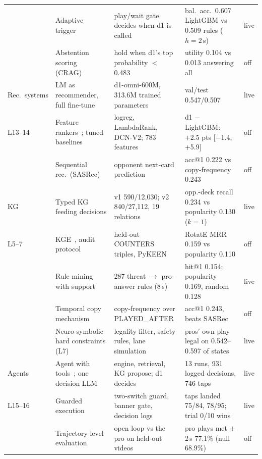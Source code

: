 \begin{table}[t]
\begin{tabular}{@{}L{1.8cm}L{4.55cm}L{4.55cm}L{5.0cm}l@{}}
 & Adaptive trigger~\cite{jiang2023flare,jeong2024adaptiverag} & play/wait gate decides when d1 is called & bal.\ acc.\ 0.607 LightGBM vs 0.509 rules ($h{=}2$\,s) & live\\
 & Abstention scoring (CRAG)~\cite{yang2024cragbench} & hold when d1's top probability $<$ 0.483 & utility 0.104 vs 0.013 answering all & off\\
Rec.\ systems
 & LM as recommender, full fine-tune~\cite{bao2023tallrec,geng2022p5} & d1-omni-600M, 313.6M trained parameters & val/test 0.547/0.507 & live\\
L13--14~\cite{lim2026l13,lim2026l14}
 & Feature rankers~\cite{wang2021dcnv2,burges2010lambdamart}; tuned baselines~\cite{rendle2020ncfvsmf} & logreg, LambdaRank, DCN-V2; 783 features & d1 $-$ LightGBM: +2.5 pts [$-$1.4, +5.9] & off\\
 & Sequential rec.\ (SASRec)~\cite{kang2018sasrec} & opponent next-card prediction & acc@1 0.222 vs copy-frequency 0.243 & off\\
KG
 & Typed KG feeding decisions & v1 590/12,030; v2 840/27,112, 19 relations & opp.-deck recall 0.234 vs popularity 0.130 ($k{=}1$) & live\\
L5--7~\cite{cap6938L05,cap6938L06C,cap6938L07}
 & KGE~\cite{bordes2013transe,yang2015distmult,trouillon2016complex,sun2019rotate}, audit protocol~\cite{ruffinelli2020olddog,sun2020reevaluation} & held-out COUNTERS triples, PyKEEN~\cite{ali2021pykeen} & RotatE MRR 0.159 vs popularity 0.110 & off\\
 & Rule mining with support~\cite{lajus2020amie3,liu2022tlogic} & 287 threat $\rightarrow$ pro-answer rules (8\,s) & hit@1 0.154; popularity 0.169, random 0.128 & live\\
 & Temporal copy mechanism~\cite{zhu2021cygnet} & copy-frequency over PLAYED\_AFTER & acc@1 0.243, beats SASRec & off\\
 & Neuro-symbolic hard constraints (L7) & legality filter, safety rules, lane simulation & pros' own play legal on 0.542--0.597 of states & live\\
Agents
 & Agent with tools~\cite{yao2023react}; one decision LLM & engine, retrieval, KG propose; d1 decides & 13 runs, 931 logged decisions, 746 taps & live\\
L15--16~\cite{lim2026l15,lim2026l16}
 & Guarded execution & two-switch guard, banner gate, decision logs & taps landed 75/84, 78/95; trial 0/10 wins & live\\
 & Trajectory-level evaluation~\cite{yao2025taubench} & open loop vs the pro on held-out videos & pro plays met $\pm$2\,s 77.1\% (null 68.9\%) & off\\

\end{tabular}
\end{table}
